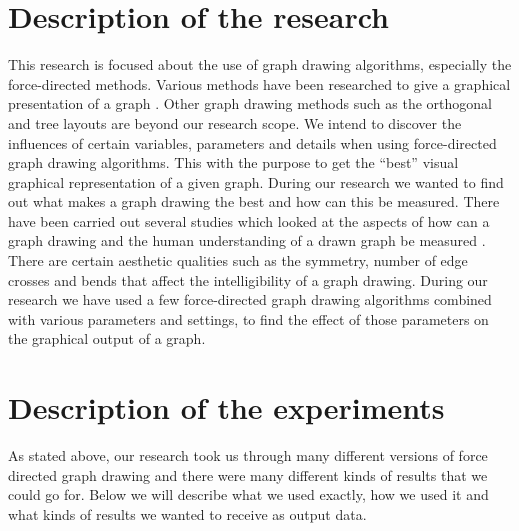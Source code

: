 \documentclass[a4paper,12pt,twoside]{article}
\begin{document}
\section{Description of the research}
This research is focused about the use of graph drawing algorithms, especially the force-directed methods. Various methods have been researched to give a graphical presentation of a graph \cite{Ioannis G Tollis}. Other graph drawing methods such as the orthogonal and tree layouts are beyond our research scope. We intend to discover the influences of certain variables, parameters and details when using force-directed graph drawing algorithms. This with the purpose to get the “best” visual graphical representation of a given graph. During our research we wanted to find out what makes a graph drawing the best and how can this be measured.\newline
There have been carried out several studies which looked at the aspects of how can a graph drawing and the human understanding of a drawn graph be measured \cite{Purchase}. There are certain aesthetic qualities such as the symmetry, number of edge crosses and bends that affect the intelligibility of a graph drawing. During our research we have used a few force-directed graph drawing algorithms combined with various parameters and settings, to find the effect of those parameters on the graphical output of a graph.

\section{Description of the experiments}
As stated above, our research took us through many different versions of force directed graph drawing and there were many different kinds of results that we could go for. Below we will describe what we used exactly, how we used it and what kinds of results we wanted to receive as output data.
\end{document}
